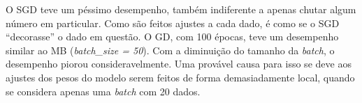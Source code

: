 \documentclass[a4paper]{article}
\begin{document}
O SGD teve um péssimo desempenho, também indiferente a apenas chutar algum número em particular. Como são feitos ajustes a cada dado, é como se o SGD “decorasse” o dado em questão. O GD, com 100 épocas, teve um desempenho similar ao MB (\textit{batch\_size = 50}). Com a diminuição do tamanho da \textit{batch}, o desempenho piorou consideravelmente. Uma provável causa para isso se deve aos ajustes dos pesos do modelo serem feitos de forma demasiadamente local, quando se considera apenas uma \textit{batch} com 20 dados.
\end{document}
